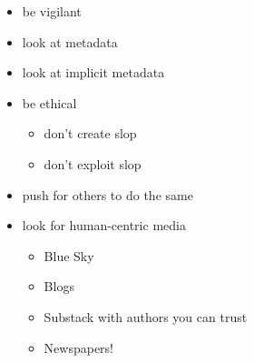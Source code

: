 \documentclass[a4paper,landscape,headrule,footrule,xetex]{foils}
\begin{document}
\begin{itemize}
\item be vigilant
\item look at metadata
\item look at implicit metadata
\item be ethical
  \begin{itemize}
  \item don't create slop
  \item don't exploit slop
  \end{itemize}
\item push for others to do the same
\item look for human-centric media
  \begin{itemize}
  \item Blue Sky
  \item Blogs
  \item Substack with authors you can trust
  \item Newspapers! 
  \end{itemize}
\end{itemize}
  





\end{document}
